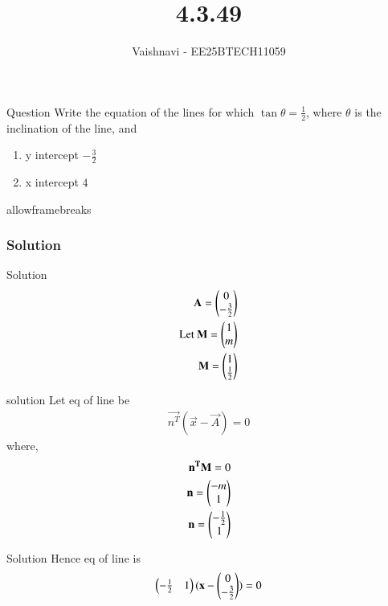 \documentclass{beamer}
\title %
{4.3.49}
\author %
{Vaishnavi - EE25BTECH11059}
\begin{document}
\frame{\titlepage}
\begin{frame}{Question}
Write the equation of the lines for which $\tan\theta = \frac{1}{2}$, where $\theta$ is the inclination of the line, and
\begin{enumerate}
\item[(a)] y intercept $- \frac{3}{2}$
\item[(b)] x intercept $4$
\end{enumerate}
\end{frame}
\begin{frame}{allowframebreaks}
\frametitle{Solution}
\begin{table}[H]    
  \centering
  
  \caption{Variables Used}
  \label{tab:1.10.2}
\end{table}

\end{frame}


\begin{frame}{Solution}
\begin{align}
\mathbf{A}=\begin{pmatrix}
                0
                \\
                 -\frac{3}{2}  \end{pmatrix}\\
\text{Let }\mathbf{M}=\begin{pmatrix}
                           1
                           \\
                            m
                            \end{pmatrix}\\
            \mathbf{M}=\begin{pmatrix}
                           1
                           \\
                            \frac{1}{2}
                            \end{pmatrix}
\end{align}

\end{frame}

\begin{frame}{solution}
Let eq of line be
\begin{align}
\vec{n^T}(\vec{x}-\vec{A})=0
\end{align}
where,
\begin{align}
\mathbf{n^T}\mathbf{M}=0\\
\mathbf{n}=\begin{pmatrix}-m
               \\
               1\end{pmatrix}\\
\mathbf{n}=\begin{pmatrix}-\frac{1}{2}
                \\
                1\end{pmatrix}
\end{align}
\end{frame}
\begin{frame}{Solution}
Hence eq of line is
\begin{align}
\begin{pmatrix}-\frac{1}{2}&1\end{pmatrix}
(\mathbf{x}-    
\begin{pmatrix}
           0
           \\
            -\frac{3}{2}
               \end{pmatrix}   )
=0
\end{align}
\end{frame}
\end{document}
